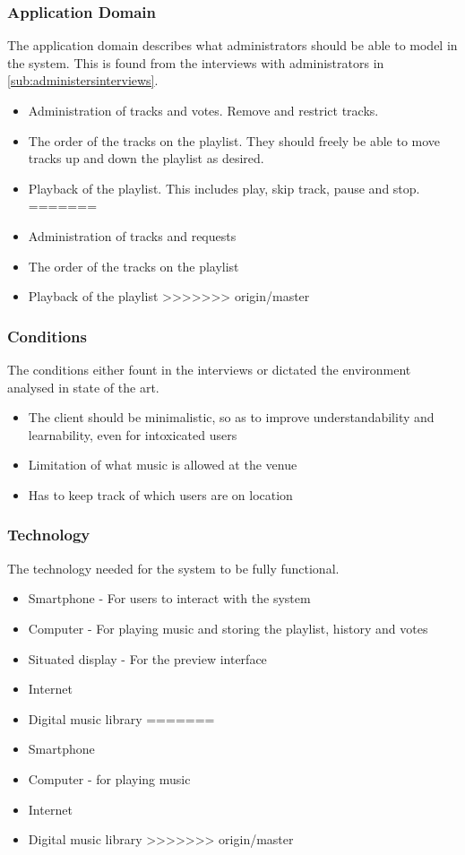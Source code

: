 \subsubsection{Application Domain}
The application domain describes what administrators should be able to model in the system. This is found from the interviews with administrators in \cref{sub:administersinterviews}.
\begin{itemize}
<<<<<<< HEAD
    \item Administration of tracks and votes. Remove and restrict tracks.
    \item The order of the tracks on the playlist. They should freely be able to move tracks up and down the playlist as desired.
    \item Playback of the playlist. This includes play, skip track, pause and stop.
=======
  \item Administration of tracks and requests
  \item The order of the tracks on the playlist
  \item Playback of the playlist
>>>>>>> origin/master
\end{itemize}

\subsubsection{Conditions}
The conditions either fount in the interviews or dictated the environment analysed in state of the art.
\begin{itemize}
  \item The client should be minimalistic, so as to improve understandability and learnability, even for intoxicated users
  \item Limitation of what music is allowed at the venue
  \item Has to keep track of which users are on location
\end{itemize}

\subsubsection{Technology}
The technology needed for the system to be fully functional.
\begin{itemize}
<<<<<<< HEAD
    \item Smartphone - For users to interact with the system
    \item Computer - For playing music and storing the playlist, history and votes
		\item Situated display - For the preview interface
    \item Internet
    \item Digital music library
=======
  \item Smartphone
  \item Computer - for playing music
  \item Internet
  \item Digital music library
>>>>>>> origin/master
\end{itemize}

